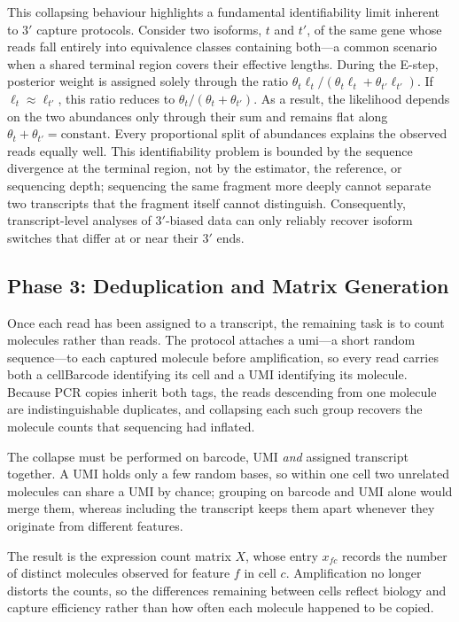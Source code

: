 This collapsing behaviour highlights a fundamental identifiability limit inherent to $3'$ capture protocols. Consider two isoforms, $t$ and $t'$, of the same gene whose reads fall entirely into equivalence classes containing both---a common scenario when a shared terminal region covers their effective lengths. During the E-step, posterior weight is assigned solely through the ratio $\theta_t \ell_t / (\theta_t \ell_t + \theta_{t'} \ell_{t'})$. If $\ell_t \approx \ell_{t'}$, this ratio reduces to $\theta_t / (\theta_t + \theta_{t'})$. As a result, the likelihood depends on the two abundances only through their sum and remains flat along $\theta_t + \theta_{t'} = \text{constant}$. Every proportional split of abundances explains the observed reads equally well. This identifiability problem is bounded by the sequence divergence at the terminal region, not by the estimator, the reference, or sequencing depth; sequencing the same fragment more deeply cannot separate two transcripts that the fragment itself cannot distinguish. Consequently, transcript-level analyses of $3'$-biased data can only reliably recover isoform switches that differ at or near their $3'$ ends.

\subsection{Phase 3: Deduplication and Matrix Generation}

Once each read has been assigned to a transcript, the remaining task is to count molecules rather than reads. The protocol attaches a \gls{umi}---a short random sequence---to each captured molecule before amplification, so every read carries both a \gls{cellBarcode} identifying its cell and a UMI identifying its molecule. Because PCR copies inherit both tags, the reads descending from one molecule are indistinguishable duplicates, and collapsing each such group recovers the molecule counts that sequencing had inflated.

The collapse must be performed on barcode, UMI \emph{and} assigned transcript together. A UMI holds only a few random bases, so within one cell two unrelated molecules can share a UMI by chance; grouping on barcode and UMI alone would merge them, whereas including the transcript keeps them apart whenever they originate from different features.

The result is the expression count matrix $X$, whose entry $x_{fc}$ records the number of distinct molecules observed for feature $f$ in cell $c$. Amplification no longer distorts the counts, so the differences remaining between cells reflect biology and capture efficiency rather than how often each molecule happened to be copied.



